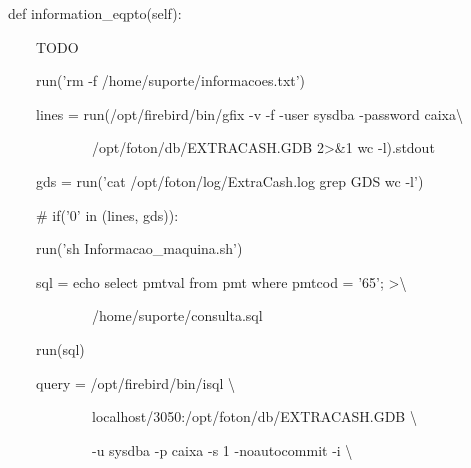 {\ttfamily\color[rgb]{0.10980392,0.10980392,0.10980392}
    \ \ \ \ def information\_eqpto(self):}

{\ttfamily\color[rgb]{0.10980392,0.10980392,0.10980392}
    \ \ \ \ \ \ \ \ {\textquotedbl}TODO{\textquotedbl}}

{\ttfamily\color[rgb]{0.10980392,0.10980392,0.10980392}
    \ \ \ \ \ \ \ \ run('rm -f /home/suporte/informacoes.txt')}

{\ttfamily\color[rgb]{0.10980392,0.10980392,0.10980392}
    \ \ \ \ \ \ \ \ lines = run({\textquotedbl}/opt/firebird/bin/gfix -v -f -user sysdba -password caixa{\textbackslash}}

            {\ttfamily\color[rgb]{0.10980392,0.10980392,0.10980392}
            \ \ \ \ \ \ \ \ \ \ \ \ \ \ \ \ /opt/foton/db/EXTRACASH.GDB 2{\textgreater}\&1 {\textbar} wc -l{\textquotedbl}).stdout}

{\ttfamily\color[rgb]{0.10980392,0.10980392,0.10980392}
    \ \ \ \ \ \ \ \ gds = run('cat /opt/foton/log/ExtraCash.log {\textbar}grep GDS {\textbar}wc -l')}

{\ttfamily\color[rgb]{0.10980392,0.10980392,0.10980392}
    \ \ \ \ \ \ \ \ \# if('0' in (lines, gds)):}

{\ttfamily\color[rgb]{0.10980392,0.10980392,0.10980392}
    \ \ \ \ \ \ \ \ run('sh Informacao\_maquina.sh')}


    \bigskip

{\ttfamily\color[rgb]{0.10980392,0.10980392,0.10980392}
    \ \ \ \ \ \ \ \ sql = {\textquotedbl}{\textquotedbl}{\textquotedbl}echo {\textquotedbl}select pmtval from pmt where
        pmtcod = '65';{\textquotedbl} {\textgreater}{\textbackslash}}

{\ttfamily\color[rgb]{0.10980392,0.10980392,0.10980392}
    \ \ \ \ \ \ \ \ \ \ \ \ \ \ \ \ /home/suporte/consulta.sql{\textquotedbl}{\textquotedbl}{\textquotedbl}}

{\ttfamily\color[rgb]{0.10980392,0.10980392,0.10980392}
    \ \ \ \ \ \ \ \ run(sql)}


    \bigskip

{\ttfamily\color[rgb]{0.10980392,0.10980392,0.10980392}
    \ \ \ \ \ \ \ \ query = {\textquotedbl}{\textquotedbl}{\textquotedbl}/opt/firebird/bin/isql {\textbackslash}}

{\ttfamily\color[rgb]{0.10980392,0.10980392,0.10980392}
    \ \ \ \ \ \ \ \ \ \ \ \ \ \ \ \ localhost/3050:/opt/foton/db/EXTRACASH.GDB {\textbackslash}}

{\ttfamily\color[rgb]{0.10980392,0.10980392,0.10980392}
    \ \ \ \ \ \ \ \ \ \ \ \ \ \ \ \ {}-u sysdba -p caixa -s 1 -noautocommit -i {\textbackslash}}

